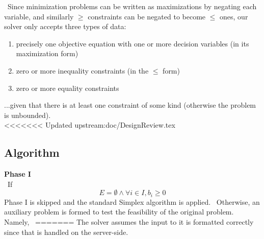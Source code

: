 \documentclass[11pt]{article}
\begin{document}
~\indent Since minimization problems can be written as maximizations by negating each variable, 
and similarly $\geq$ constraints can be negated to become $\leq$ ones, 
our solver only accepts three types of data:
\begin{enumerate}
\item precisely one objective equation with one or more decision variables (in its maximization form)
\item zero or more inequality constraints (in the $\leq$ form)
\item zero or more equality constraints
\end{enumerate}
...given that there is at least one constraint of some kind (otherwise the problem is unbounded).\\
<<<<<<< Updated upstream:doc/DesignReview.tex

\subsection{Algorithm}
\textbf{Phase I}\\
~\indent If $$E = \emptyset  \land  \forall i \in I, b_i \geq 0$$ Phase I is skipped and the standard Simplex algorithm is applied.~\cite{wolfram} Otherwise, an auxiliary problem is formed to test the feasibility of the original problem. Namely,~\cite{wolfram}
=======
The solver assumes the input to it is formatted correctly since that is handled on the server-side.
\end{document}
